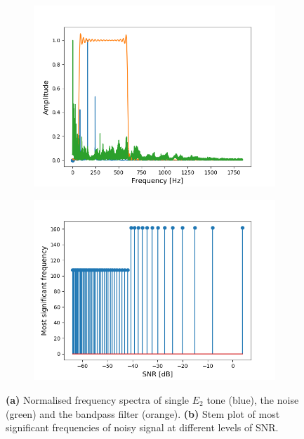 \begin{figure}[H]
\begin{subfigure}{0.49\textwidth}
\centering
\includegraphics[width=\textwidth]{figures/SNR/single_spectrum.png}
\caption{}
\label{fig:single_spectrum}
\end{subfigure}
\begin{subfigure}{0.49\textwidth}
\centering
\includegraphics[width=\textwidth]{figures/SNR/single_stem.png}
\caption{}
\label{fig:single_stem}
\end{subfigure}
\caption{\textbf{(a)} Normalised frequency spectra of single $E_2$ tone (blue), the noise (green) and the bandpass filter (orange). \textbf{(b)} Stem plot of most significant frequencies of noisy signal at different levels of SNR.}
\label{fig:single_noise}
\end{figure}

